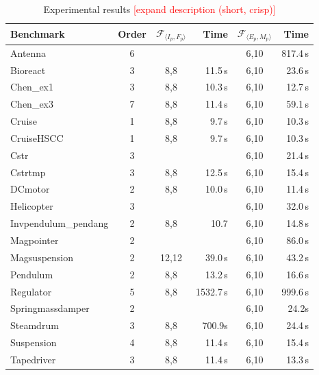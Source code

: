 \documentclass[twocolumn]{autart}    %
\newcommand{\xmark}{\ding{55}}
\renewcommand{\note}[1]{\textcolor{red}{[#1]}}
\begin{document}
\begin{table}
\centering
\begin{tabular}{| l | c | c | r | c | r |}
%
\hline
 Benchmark  &  Order  & $\mathcal{F}_{\langle I_p,F_p \rangle}$ & Time & $\mathcal{F}_{\langle E_p, M_p \rangle}$ & Time \\\hline
 Antenna     & 6 &  & ~\xmark & 6,10 & 817.4\,s \\
 Bioreact    & 3 & 8,8 & 11.5\,s & 6,10 &23.6\,s \\
 Chen\_ex1   & 3 & 8,8 & 10.3\,s  & 6,10 & 12.7\,s \\
 Chen\_ex3   & 7 & 8,8  & 11.4\,s & 6,10 & 59.1\,s \\
 Cruise      & 1 & 8,8 & 9.7\,s & 6,10 & 10.3\,s \\
 CruiseHSCC & 1 & 8,8 & 9.7\,s & 6,10 & 10.3\,s  \\
 Cstr & 3 & & ~\xmark & 6,10 & 21.4\,s \\
 Cstrtmp  & 3 & 8,8 & 12.5\,s &6,10 & 15.4\,s \\
 DCmotor   & 2 & 8,8  & 10.0\,s & 6,10 & 11.4\,s  \\
 Helicopter   & 3 &  & ~\xmark & 6,10 & 32.0\,s \\
 Invpendulum\_pendang & 2 & 8,8  & 10.7 & 6,10 & 14.8\,s\\
 Magpointer   & 2 &  & ~\xmark & 6,10 & 86.0\,s \\
 Magsuspension  & 2 & 12,12  & 39.0\,s  & 6,10 & 43.2\,s \\
 Pendulum   & 2 & 8,8 & 13.2\,s & 6,10 & 16.6\,s\\
 Regulator   & 5 & 8,8 & 1532.7\,s & 6,10 & 999.6\,s\\
 Springmassdamper & 2 & & ~\xmark &6,10 & 24.2s \\
 Steamdrum   & 3 & 8,8  & 700.9s & 6,10 & 24.4\,s \\
 Suspension  & 4 & 8,8  & 11.4\,s & 6,10 &15.4\,s \\
 Tapedriver   & 3 & 8,8  & 11.4\,s &6,10 & 13.3\,s \\
\hline
%
\end{tabular}
\vspace{0.05in}
\caption{Experimental results \note{expand description (short, crisp)}\label{tab:results}}
\end{table}
\end{document}
